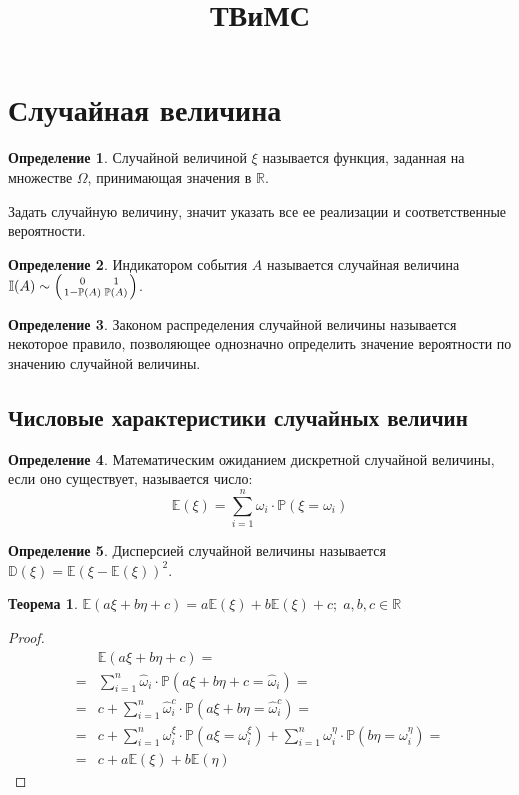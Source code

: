 \documentclass[12pt]{article}
\title{\textbf{ТВиМС}}\date{}\author{}
\theoremstyle{definition}
\newtheorem{theorem}{Теорема}[section]
\newtheorem{definition}{Определение}
\newcommand{\R}{\mathbb{R}}
\newcommand{\I}{\mathbb{I}}
\newcommand{\E}{\mathbb{E}}
\newcommand{\D}{\mathbb{D}}
\newcommand{\prob}{\mathbb{P}}
\begin{document}
\maketitle
\tableofcontents
\label{toc}
\newpage

\section{Случайная величина}

\begin{definition}
    Случайной величиной $\xi$ называется функция, заданная на множестве $\Omega$, принимающая значения в $\R$.
\end{definition}

    Задать случайную величину, значит указать все ее реализации и соответственные вероятности.

\begin{definition}
    Индикатором события $A$ называется случайная величина $\I(A)\sim \left({0 \atop 1-\prob(A)} {1 \atop \prob(A)} \right)$.
\end{definition}

\begin{definition}
    Законом распределения случайной величины называется некоторое правило, позволяющее однозначно определить значение вероятности по значению случайной величины.
\end{definition}

    \subsection{Числовые характеристики случайных величин}

\begin{definition}
    Математическим ожиданием дискретной случайной величины, если оно существует, называется число: 
    $$\E (\xi)=\sum_{i=1}^{n}\omega_i\cdot \prob(\xi=\omega_i)$$
\end{definition}

\begin{definition}
    Дисперсией случайной величины называется $\D(\xi)=\E(\xi-\E(\xi))^2$.
\end{definition}

\begin{theorem}
    $\E(a\xi+b\eta+c)=a\E(\xi)+b\E(\xi)+c;\;a,b,c\in \R$
\end{theorem}

\begin{proof}
    \begin{align*}
        &\E(a\xi+b\eta+c)=\\
        =&\sum_{i=1}^n \widehat{\omega}_i\cdot\prob(a\xi+b\eta+c=\widehat{\omega}_i)=\\
        =&c+\sum_{i=1}^n \widehat{\omega}_i^c\cdot\prob(a\xi+b\eta=\widehat{\omega}_i^c)=\\
        =&c+\sum_{i=1}^n \omega_i^\xi\cdot \prob(a\xi=\omega_i^\xi)+\sum_{i=1}^n \omega_i^\eta\cdot\prob(b\eta=\omega_i^\eta)=\\            =&c+a\E(\xi)+b\E(\eta)
    \end{align*}
\end{proof}
\end{document}
